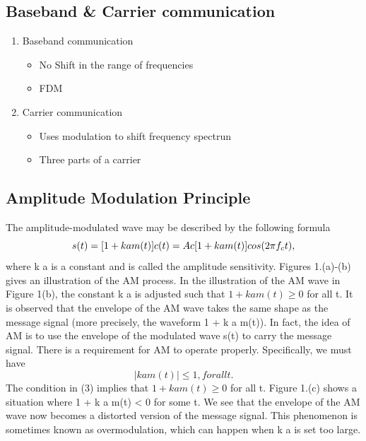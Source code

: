 \subsection{Baseband \& Carrier communication}
\begin{enumerate}
  \item Baseband communication\\
  \begin{itemize}
    \item No Shift in the range of frequencies
    \item FDM
  \end{itemize}

  \item Carrier communication\\
  \begin{itemize}
    \item Uses modulation to shift frequency spectrun
    \item Three parts of a carrier
  \end{itemize}

\end{enumerate}

\subsection{Amplitude Modulation Principle}
The amplitude-modulated wave may be described by the following formula
\begin{equation}
  s(t) = [1 + k a m(t)] c(t)\\
  = A c [1 + k a m(t)] cos(2\pi f_c t),
\end{equation}
where k a is a constant and is called the amplitude sensitivity. Figures 1.(a)-(b) gives an illustration
of the AM process. In the illustration of the AM wave in Figure 1(b), the constant k a is adjusted
such that $1 + k a m(t) \geq 0$ for all t. It is observed that the envelope of the AM wave takes the same
shape as the message signal (more precisely, the waveform 1 + k a m(t)). In fact, the idea of AM is
to use the envelope of the modulated wave s(t) to carry the message signal.
There is a requirement for AM to operate properly. Specifically, we must have
\begin{equation}
  |k a m(t)| \leq 1, for all t.
\end{equation}
The condition in (3) implies that $1 + k a m(t) \geq 0$ for all t. Figure 1.(c) shows a situation where
1 + k a m(t) < 0 for some t. We see that the envelope of the AM wave now becomes a distorted version of the message signal. This phenomenon is sometimes known as overmodulation, which can
happen when k a is set too large.

